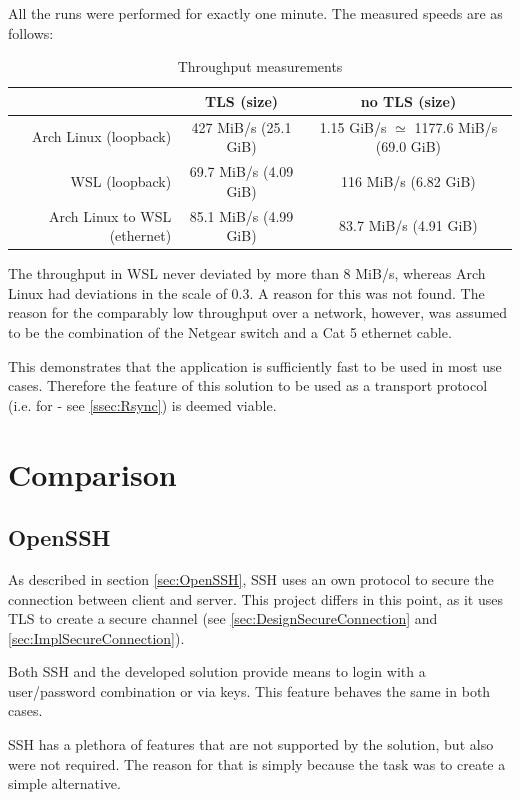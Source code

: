 \documentclass[10pt,a4paper,titlepage,twoside,english,final]{zhawreprt}
\begin{document}
All the runs were performed for exactly one minute.
The measured speeds are as follows:
\begin{table}[ht]
\centering
\begin{tabular}{rcc}
&\gls{TLS} (size) & no \gls{TLS} (size)\\\hline
Arch \gls{Linux} (\gls{loopback}) 			& 427 MiB/s (25.1 GiB) & 1.15 GiB/s $\simeq$ 1177.6 MiB/s (69.0 GiB)\\
\gls{WSL} (\gls{loopback}) 					& 69.7 MiB/s (4.09 GiB) & 116 MiB/s (6.82 GiB)\\
Arch \gls{Linux} to \gls{WSL} (ethernet) 	& 85.1 MiB/s (4.99 GiB) & 83.7 MiB/s (4.91 GiB)
\end{tabular}
\caption{Throughput measurements}
\label{tbl:}
\end{table}

The throughput in \gls{WSL} never deviated by more than 8 MiB/s, whereas Arch \gls{Linux} had deviations in the scale of 0.3.
A reason for this was not found.
The reason for the comparably low throughput over a network, however, was assumed to be the combination of the Netgear switch and a Cat 5 ethernet cable.

This demonstrates that the application is sufficiently fast to be used in most use cases.
Therefore the feature of this solution to be used as a transport protocol (i.e. for \cite{rsync} - see \ref{ssec:Rsync}) is deemed viable.


\section{Comparison}\label{sec:Comparison}
\subsection{OpenSSH}\label{ssec:CompOpenSSH}
As described in section \ref{sec:OpenSSH}, \gls{SSH} uses an own protocol to secure the connection between client and server.
This project differs in this point, as it uses \gls{TLS} to create a secure channel (see \ref{sec:DesignSecureConnection} and \ref{sec:ImplSecureConnection}).

Both \gls{SSH} and the developed solution provide means to login with a user/password combination or via keys.
This feature behaves the same in both cases.

\gls{SSH} has a plethora of features that are not supported by the solution, but also were not required.
The reason for that is simply because the task was to create a simple alternative.
\end{document}

